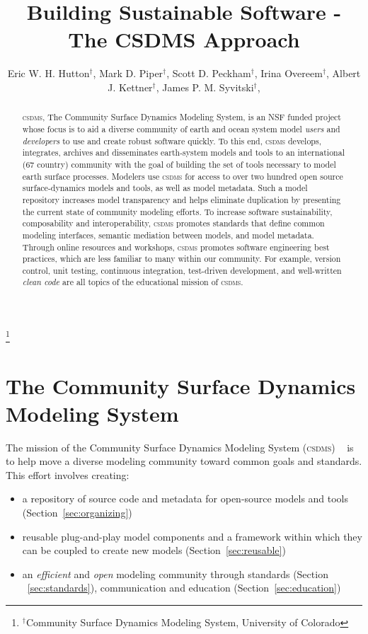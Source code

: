 \documentclass[11pt, oneside]{amsart}
\DeclareRobustCommand{\csdms}{\textsc{csdms}}
\begin{document}
\title[]{Building Sustainable Software - The CSDMS Approach}

\author{
  Eric W. H. Hutton$^{\dag}$,
  Mark D. Piper$^{\dag}$,
  Scott D. Peckham$^{\dag}$,
  Irina Overeem$^{\dag}$,
  Albert J. Kettner$^{\dag}$,
  James P. M. Syvitski$^{\dag}$,
}

\thanks{{}$^{\dag}$Community Surface Dynamics Modeling System, University of
Colorado}

\begin{abstract}

\csdms{}, The Community Surface Dynamics Modeling System, is an NSF funded
project whose focus is to aid a diverse community of earth and ocean system
model \emph{users} and \emph{developers} to use and create robust software
quickly.  To this end, \csdms{} develops, integrates, archives and disseminates
earth-system models and tools to an international (67 country) community
with the goal of building the set of tools necessary to model
earth surface processes. Modelers use \csdms{} for access to over two hundred open
source surface-dynamics models and tools, as well as model metadata. Such a
model repository increases model transparency and helps eliminate
duplication by presenting the current state of community modeling efforts.
To increase software sustainability, composability and interoperability,
\csdms{} promotes standards that define common modeling interfaces, semantic
mediation between models, and model metadata. Through online resources and
workshops, \csdms{} promotes software engineering best practices, which are
less familiar to many within our community. For example,
version control, unit testing, continuous integration, test-driven
development, and well-written \emph{clean code} are all topics of the
educational mission of \csdms{}.

\end{abstract}

\maketitle

\section{The Community Surface Dynamics Modeling System}

The mission of the Community Surface Dynamics Modeling System (\csdms{})
~\cite{peckham2012component} is to help move a diverse modeling community toward
common goals and standards. This effort involves creating:
\begin{itemize}
  \item a repository of source code and metadata for open-source models and
    tools (Section~\ref{sec:organizing})
  \item reusable plug-and-play model components and a framework
        within which they can be coupled to create new models
        (Section~\ref{sec:reusable})
  \item an \emph{efficient} and \emph{open} modeling community through
        standards (Section ~\ref{sec:standards}),
        communication and education (Section~\ref{sec:education})
\end{itemize}
\end{document}
